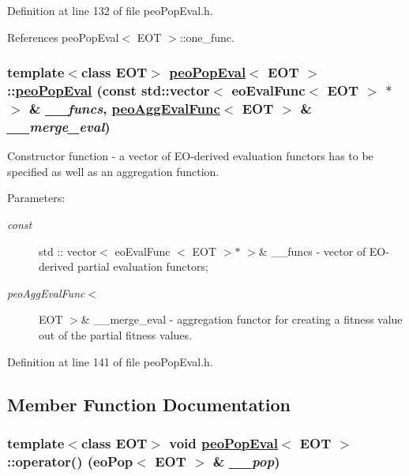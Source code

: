 Definition at line 132 of file peo\-Pop\-Eval.h.

References peo\-Pop\-Eval$<$ EOT $>$::one\_\-func.\hypertarget{classpeoPopEval_088822da7a0c92bc21574358d2e5f87c}{
\subsubsection[peoPopEval]{\setlength{\rightskip}{0pt plus 5cm}template$<$class EOT$>$ \hyperlink{classpeoPopEval}{peo\-Pop\-Eval}$<$ EOT $>$::\hyperlink{classpeoPopEval}{peo\-Pop\-Eval} (const std::vector$<$ eo\-Eval\-Func$<$ EOT $>$ $\ast$ $>$ \& {\em \_\-\_\-funcs}, \hyperlink{classpeoAggEvalFunc}{peo\-Agg\-Eval\-Func}$<$ EOT $>$ \& {\em \_\-\_\-merge\_\-eval})}}
\label{classpeoPopEval_088822da7a0c92bc21574358d2e5f87c}


Constructor function - a vector of EO-derived evaluation functors has to be specified as well as an aggregation function. 

\begin{Desc}
\item[Parameters:]
\begin{description}
\item[{\em const}]std :: vector$<$ eo\-Eval\-Func $<$ EOT $>$$\ast$ $>$\& \_\-\_\-funcs - vector of EO-derived partial evaluation functors; \item[{\em peo\-Agg\-Eval\-Func$<$}]EOT $>$\& \_\-\_\-merge\_\-eval - aggregation functor for creating a fitness value out of the partial fitness values. \end{description}
\end{Desc}


Definition at line 141 of file peo\-Pop\-Eval.h.

\subsection{Member Function Documentation}
\hypertarget{classpeoPopEval_593dd60fc004edea8994d5575bf66e05}{
\subsubsection[operator()]{\setlength{\rightskip}{0pt plus 5cm}template$<$class EOT$>$ void \hyperlink{classpeoPopEval}{peo\-Pop\-Eval}$<$ EOT $>$::operator() (eo\-Pop$<$ EOT $>$ \& {\em \_\-\_\-pop})}}
\label{classpeoPopEval_593dd60fc004edea8994d5575bf66e05}


